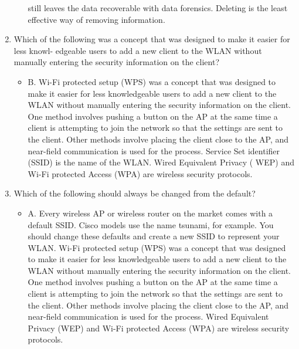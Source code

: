 \documentclass{article}
\begin{document}
\begin{enumerate}
\begin{itemize}
still leaves the data recoverable with data forensics. Deleting is the least effective way of
removing information.
    \end{itemize}
    \item Which of the following was a concept that was designed to make it easier for less knowl-
edgeable users to add a new client to the WLAN without manually entering the security
information on the client?
    \begin{itemize}
        \item B. Wi-Fi protected setup (WPS) was a concept that was designed to make it easier for
less knowledgeable users to add a new client to the WLAN without manually entering
the security information on the client. One method involves pushing a button on the AP
at the same time a client is attempting to join the network so that the settings are sent
to the client. Other methods involve placing the client close to the AP, and near-field
communication is used for the process. Service Set identifier (SSID) is the name of the
WLAN. Wired Equivalent Privacy ( WEP) and Wi-Fi protected Access (WPA) are wireless
security protocols.
    \end{itemize}
    \item Which of the following should always be changed from the default?
    \begin{itemize}
        \item A. Every wireless AP or wireless router on the market comes with a default SSID. Cisco
models use the name tsunami, for example. You should change these defaults and create a
new SSID to represent your WLAN. Wi-Fi protected setup (WPS) was a concept that was
designed to make it easier for less knowledgeable users to add a new client to the WLAN
without manually entering the security information on the client. One method involves
pushing a button on the AP at the same time a client is attempting to join the network so
that the settings are sent to the client. Other methods involve placing the client close to the
AP, and near-field communication is used for the process. Wired Equivalent Privacy (WEP)
and Wi-Fi protected Access (WPA) are wireless security protocols.
    \end{itemize}
\end{enumerate}
\end{document}
